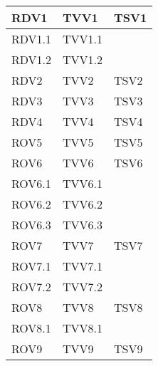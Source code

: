 \begin{center}
\begin{longtable}{| p{4cm} | p{4cm} | p{4cm} |}
	RDV1  & TVV1 & TSV1 \\
	\hline
	\hspace{2 mm} RDV1.1  & TVV1.1 &  \\
	\hline
	\hspace{2 mm} RDV1.2  & TVV1.2 &  \\
	\hline
	RDV2  & TVV2 & TSV2 \\
	\hline
	RDV3  & TVV3 & TSV3 \\
	\hline
	RDV4  & TVV4 & TSV4 \\
	\hline
	ROV5  & TVV5 & TSV5 \\
	\hline
	ROV6  & TVV6 & TSV6 \\
	\hline
	\hspace{2 mm} ROV6.1  & TVV6.1 &  \\
	\hline
	\hspace{2 mm} ROV6.2  & TVV6.2 &  \\
	\hline
	\hspace{2 mm} ROV6.3  & TVV6.3 &  \\
	\hline
	ROV7  & TVV7 & TSV7 \\
	\hline
	\hspace{2 mm} ROV7.1  & TVV7.1 &  \\
	\hline
	\hspace{2 mm} ROV7.2  & TVV7.2 &  \\
	\hline
	ROV8  & TVV8 & TSV8 \\
	\hline
	\hspace{2 mm} ROV8.1  & TVV8.1 & \\
	\hline
	ROV9  & TVV9 & TSV9 \\
	\hline
	

\end{longtable}
\egroup
\end{center}